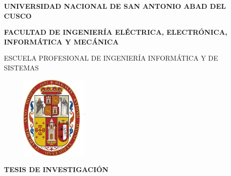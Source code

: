 \documentclass[letterpaper,12pt]{report}
\begin{document}
\sloppy
\renewcommand\bibname{BIBLIOGRAFIA}

\thispagestyle{empty} %

\begin{center} {\large \bf UNIVERSIDAD NACIONAL DE SAN ANTONIO ABAD DEL CUSCO} \end{center}
\begin{center} {\large \bf FACULTAD DE INGENIERÍA ELÉCTRICA, ELECTRÓNICA, INFORMÁTICA Y MECÁNICA} \end{center}
\begin{center} {\large  ESCUELA PROFESIONAL DE INGENIERÍA INFORMÁTICA Y DE SISTEMAS} \end{center}
\vspace{0.5cm}
\begin{figure}[htb]
\centering
\includegraphics[width=33mm]{Imagenes/simbolo_unsaac.png}
\end{figure}
\vspace{0.5cm}
\begin{center} {\large \textbf{TESIS DE INVESTIGACIÓN}} \end{center}
\vspace{0.5cm}
\end{document}
